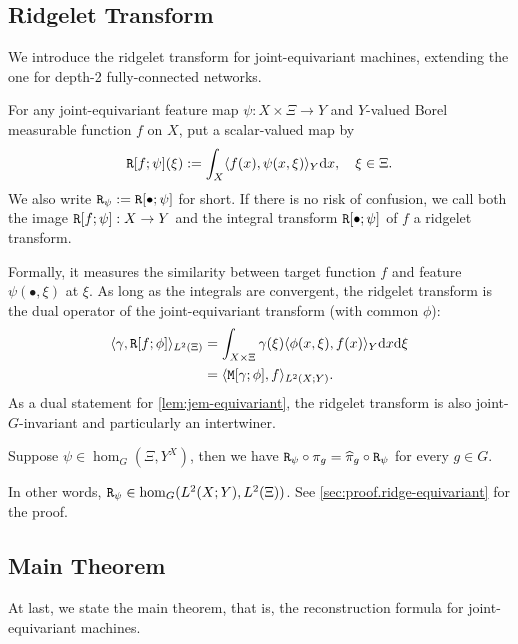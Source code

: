 \subsection{Ridgelet Transform}
We introduce the ridgelet transform for joint-equivariant machines, extending the one for depth-2 fully-connected networks.
\begin{definition}
For any joint-equivariant feature map $\psi:X \times \Xi \to Y$ and $Y$-valued Borel measurable function $f$ on $X$, put a scalar-valued map by
\begin{align*}
    \mathtt{R}[f;\psi](\xi) := 
    \int_X \langle f(x), \psi(x,\xi)\rangle_{Y} \mathrm{d} x, \quad \xi \in \Xi.
\end{align*}
We also write $\mathtt{R}_\psi := \mathtt{R}[\bullet;\psi]$ for short.
If there is no risk of confusion, we call both the image $\mathtt{R}[f;\psi] : X \to Y$ and the integral transform $\mathtt{R}[\bullet;\psi]$ of $f$ a ridgelet transform.
\end{definition}
Formally, it measures the similarity between target function $f$ and feature $\psi(\bullet,\xi)$ at $\xi$.
As long as the integrals are convergent, the ridgelet transform is the dual operator of the joint-equivariant transform (with common $\phi$):
\begin{align*}
    \langle \gamma, \mathtt{R}[f;\phi] \rangle_{L^2(\Xi)}
    &= \int_{X \times \Xi} \gamma(\xi) \langle\phi(x,\xi), f(x)\rangle_{Y} \mathrm{d} x \mathrm{d} \xi\\
    &= \langle \mathtt{M}[\gamma;\phi], f \rangle_{L^2(X;Y)}.
\end{align*}
As a dual statement for \cref{lem:jem-equivariant}, 
the ridgelet transform is also joint-$G$-invariant and particularly an intertwiner. 
\begin{lemma} \label{lem:ridge-equivariant}
Suppose $\psi \in \hom_G(\Xi,Y^X)$, then we have $\mathtt{R}_\psi \circ \pi_g = \widehat{\pi}_g \circ \mathtt{R}_\psi$ for every $g \in G$.
\end{lemma}
In other words, $\mathtt{R}_\psi \in \hom_G(L^2(X;Y),L^2(\Xi))$.
See \cref{sec:proof.ridge-equivariant} for the proof.

\subsection{Main Theorem}
At last, we state the main theorem, that is, the reconstruction formula for joint-equivariant machines.

